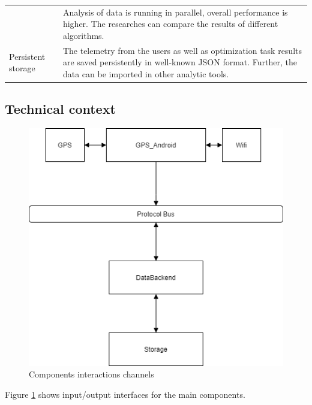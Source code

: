 \begin{longtable}[]{@{}ll@{}}
\begin{minipage}[t]{0.31\columnwidth}
	\end{minipage} & \begin{minipage}[t]{0.63\columnwidth}\raggedright
		Analysis of data is running in parallel, overall performance is higher. The
		researches can compare the results of different algorithms.\strut
	\end{minipage}\tabularnewline
	\begin{minipage}[t]{0.31\columnwidth}\raggedright
		Persistent storage\strut
	\end{minipage} & \begin{minipage}[t]{0.63\columnwidth}\raggedright
		The telemetry from the users as well as optimization task results are
		saved persistently in well-known JSON format. Further, the data can be
		imported in other analytic tools.\strut
	\end{minipage}\tabularnewline
	\bottomrule
\end{longtable}

\subsection{Technical context}\label{technical-context}

\begin{figure}[H]
	\includegraphics[width=\textwidth,height=\textheight,keepaspectratio]{schemes/architecture/ArchitectureDiagram.png}
	\caption{Components interactions channels}
	\label{fig:technical-context}

\end{figure}

Figure \ref{fig:technical-context} shows input/output interfaces for the main
components.


